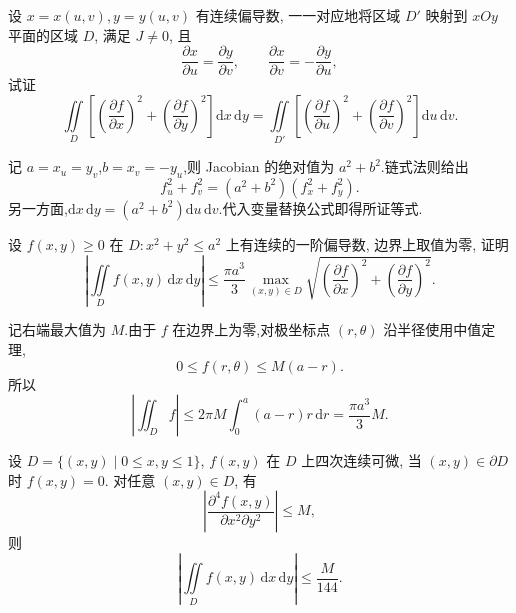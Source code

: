 \begin{example}
    设 $x=x(u,v),y=y(u,v)$ 有连续偏导数, 一一对应地将区域 $D'$ 映射到 $xOy$ 平面的区域 $D$, 满足 $J\ne0$, 且
    \[
        \dfrac{\partial x}{\partial u}=\dfrac{\partial y}{\partial v},\qquad
        \dfrac{\partial x}{\partial v}=-\dfrac{\partial y}{\partial u},
    \]
    试证
    \[
        \displaystyle\iint\limits_D\left[\left(\dfrac{\partial f}{\partial x}\right)^2+
            \left(\dfrac{\partial f}{\partial y}\right)^2\right]\mathrm{d}x\,\mathrm{d}y
        =\iint\limits_{D'}\left[\left(\dfrac{\partial f}{\partial u}\right)^2+
            \left(\dfrac{\partial f}{\partial v}\right)^2\right]\mathrm{d}u\,\mathrm{d}v.
    \]
\end{example}
\exampleblank

\begin{solution}
    记 $a=x_u=y_v$,$b=x_v=-y_u$,则 Jacobian 的绝对值为 $a^2+b^2$.链式法则给出
    \[
        f_u^2+f_v^2=(a^2+b^2)(f_x^2+f_y^2).
    \]
    另一方面,$\mathrm{d}x\,\mathrm{d}y=(a^2+b^2)\mathrm{d}u\,\mathrm{d}v$.代入变量替换公式即得所证等式.
\end{solution}

\begin{example}
    设 $f(x,y)\geq0$ 在 $D:x^2+y^2\leq a^2$ 上有连续的一阶偏导数, 边界上取值为零, 证明
    \[
        \left|\iint\limits_Df(x,y)\,\mathrm{d}x\,\mathrm{d}y\right|
        \leq\dfrac{\pi a^3}{3}
        \max_{(x,y)\in D}\sqrt{\left(\dfrac{\partial f}{\partial x}\right)^2+
            \left(\dfrac{\partial f}{\partial y}\right)^2}.
    \]
\end{example}
\exampleblank

\begin{solution}
    记右端最大值为 $M$.由于 $f$ 在边界上为零,对极坐标点 $(r,\theta)$ 沿半径使用中值定理,
    \[
        0\leq f(r,\theta)\leq M(a-r).
    \]
    所以
    \[
        \left|\iint_Df\right|\leq2\pi M\int_0^a(a-r)r\,\mathrm{d}r
        =\dfrac{\pi a^3}{3}M.
    \]
\end{solution}

\begin{example}
    设 $D=\{(x,y)\mid0\leq x,y\leq1\}$, $f(x,y)$ 在 $D$ 上四次连续可微, 当 $(x,y)\in\partial D$ 时 $f(x,y)=0$. 对任意 $(x,y)\in D$, 有
    \[
        \left|\dfrac{\partial^4f(x,y)}{\partial x^2\partial y^2}\right|\leq M,
    \]
    则
    \[
        \left|\iint\limits_Df(x,y)\,\mathrm{d}x\,\mathrm{d}y\right|\leq\dfrac{M}{144}.
    \]
\end{example}
\exampleblank


